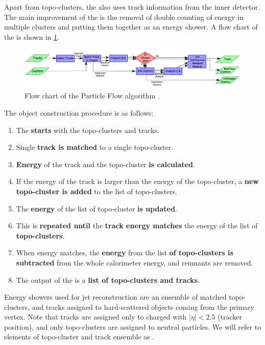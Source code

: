 Apart from topo-clusters, the \PFa also uses track information from the inner detector.
The main improvement of the \PFa is the removal of double counting of energy in multiple clusters and putting them together as an energy shower.
A flow chart of the \PFa is shown in \cref{fig:pfo}.
\begin{figure}[ht]
    \centering
    \includegraphics[width=1.\textwidth]{src/img/PF_algorithm.png}
    \caption{Flow chart of the Particle Flow algorithm \cite{PFO}.}
    \label{fig:pfo}
\end{figure}

The object construction procedure is as follows:
\begin{enumerate}
    \item The \PFa \textbf{starts} with the topo-clusters and tracks.
    \item Single \textbf{track is matched} to a single topo-cluster.
    \item \textbf{Energy} of the track and the topo-cluster \textbf{is calculated}.
    \item If the energy of the track is larger than the energy of the topo-cluster, a \textbf{new topo-cluster is added} to the list of topo-clusters.
    \item The \textbf{energy} of the list of topo-cluster \textbf{is updated}.
    \item This is \textbf{repeated until} the \textbf{track energy matches} the energy of the list of \textbf{topo-clusters}.
    \item When energy matches, the \textbf{energy} from the list \textbf{of topo-clusters is subtracted} from the whole calorimeter energy, and remnants are removed.
    \item The output of the \PFa is a \textbf{list of topo-clusters and tracks}.
\end{enumerate}

Energy showers used for jet reconstruction are an ensemble of matched topo-clusters, and tracks assigned to hard-scattered objects coming from the primary vertex. 
Note that tracks are assigned only to charged with $|\eta| < 2.5$ (tracker position), and only topo-clusters are assigned to neutral particles.
We will refer to elements of topo-cluster and track ensemble as \PFOs. 

